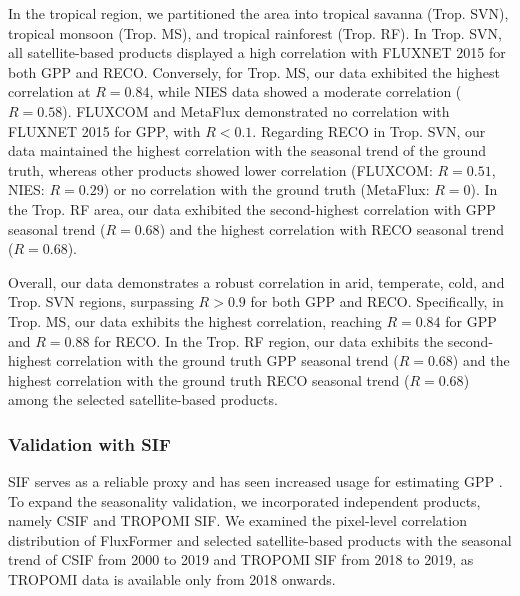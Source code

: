 In the tropical region, we partitioned the area into tropical savanna (Trop. SVN), tropical monsoon (Trop. MS), and tropical rainforest (Trop. RF). In Trop. SVN, all satellite-based products displayed a high correlation with FLUXNET 2015 for both GPP and RECO. Conversely, for Trop. MS, our data exhibited the highest correlation at $R=0.84$, while NIES data showed a moderate correlation ($R=0.58$). FLUXCOM and MetaFlux demonstrated no correlation with FLUXNET 2015 for GPP, with $R<0.1$. Regarding RECO in Trop. SVN, our data maintained the highest correlation with the seasonal trend of the ground truth, whereas other products showed lower correlation (FLUXCOM: $R=0.51$, NIES: $R=0.29$) or no correlation with the ground truth (MetaFlux: $R=0$). In the Trop. RF area, our data exhibited the second-highest correlation with GPP seasonal trend ($R=0.68$) and the highest correlation with RECO seasonal trend ($R=0.68$).\par
Overall, our data demonstrates a robust correlation in arid, temperate, cold, and Trop. SVN regions, surpassing $R> 0.9$ for both GPP and RECO. Specifically, in Trop. MS, our data exhibits the highest correlation, reaching $R=0.84$ for GPP and $R=0.88$ for RECO. In the Trop. RF region, our data exhibits the second-highest correlation with the ground truth GPP seasonal trend ($R=0.68$) and the highest correlation with the ground truth RECO seasonal trend ($R=0.68$) among the selected satellite-based products. \par


\subsubsection{Validation with SIF}
SIF serves as a reliable proxy and has seen increased usage for estimating GPP \citep{norton2019estimating, liu2020improving, bai2022estimation}. To expand the seasonality validation, we incorporated independent products, namely CSIF and TROPOMI SIF. We examined the pixel-level correlation distribution of FluxFormer and selected satellite-based products with the seasonal trend of CSIF from 2000 to 2019 and TROPOMI SIF from 2018 to 2019, as TROPOMI data is available only from 2018 onwards.\par

